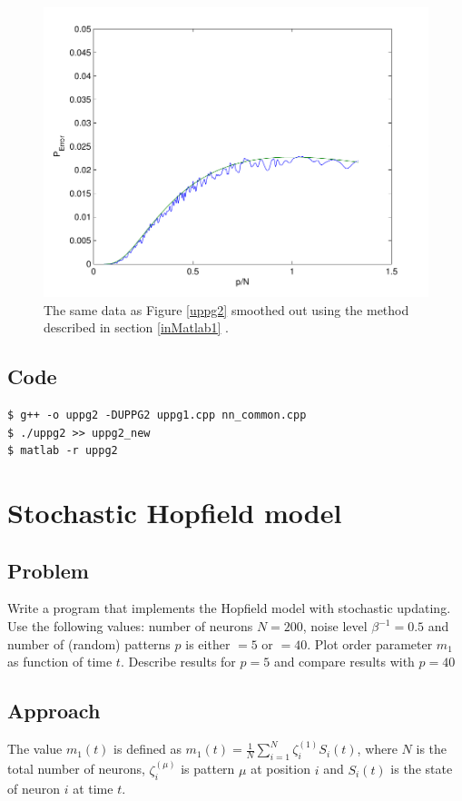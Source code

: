 \documentclass[12pt,a4paper]{article}
\begin{document}
\begin{figure}\centering
\includegraphics[width=12cm]{uppg2_smooth.pdf}
\caption{\label{uppg2_smooth} The same data as Figure \ref{uppg2} smoothed out using the method described in section \ref{inMatlab1} .}
\end{figure}

\subsection{Code}

\begin{verbatim}
$ g++ -o uppg2 -DUPPG2 uppg1.cpp nn_common.cpp
$ ./uppg2 >> uppg2_new
$ matlab -r uppg2
\end{verbatim}

\section{Stochastic Hopfield model}
\subsection{Problem}
Write a program that implements the Hopfield model with stochastic updating.
Use the following values: number of neurons $N = 200$, noise level
$\beta^{-1} = 0.5$ and number of (random) patterns $p$ is either $=5$ or
$=40$. Plot order parameter $m_1$ as function of time $t$. Describe results for $p = 5$ and compare results with $p=40$

\subsection{Approach}
The value $m_1(t)$ is defined as $m_1(t) = \frac{1}{N} \sum_{i =1}^N
\zeta^{(1)}_i  S_i(t)$, where $N$ is the total number of neurons,
$\zeta^{(\mu)}_i$ is pattern $\mu$ at position $i$ and $S_i(t)$ is the state
of neuron $i$ at time $t$.
\end{document}
